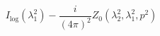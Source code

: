 \begin{equation}
I_{\log }(\lambda _{1}^{2})-\frac{i}{(4\pi )^{2}}Z_{0}(\lambda
_{2}^{2},\lambda _{1}^{2},p^{2})
\end{equation}

